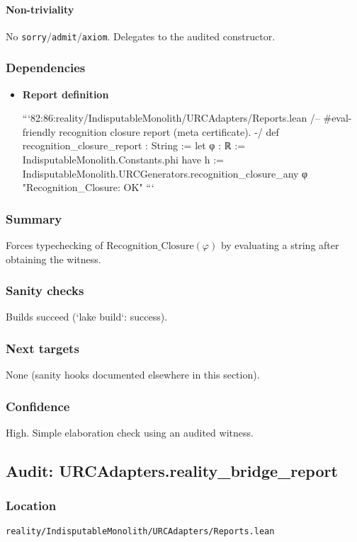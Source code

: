 \documentclass{article}
\newcommand{\FileRef}[1]{\texttt{#1}}
\begin{document}
\paragraph{Non-triviality}
No \texttt{sorry}/\texttt{admit}/\texttt{axiom}. Delegates to the audited constructor.

\subsubsection{Dependencies}
\begin{itemize}[leftmargin=*]
  \item \textbf{Report definition}

```82:86:reality/IndisputableMonolith/URCAdapters/Reports.lean
/-- #eval-friendly recognition closure report (meta certificate). -/
 def recognition_closure_report : String :=
  let φ : ℝ := IndisputableMonolith.Constants.phi
  have h := IndisputableMonolith.URCGenerators.recognition_closure_any φ
  "Recognition_Closure: OK"
```
\end{itemize}

\subsubsection{Summary}
Forces typechecking of \(\mathrm{Recognition\_Closure}(\varphi)\) by evaluating a string after obtaining the witness.

\subsubsection{Sanity checks}
Builds succeed (`lake build`: success).

\subsubsection{Next targets}
None (sanity hooks documented elsewhere in this section).

\subsubsection{Confidence}
High. Simple elaboration check using an audited witness.

\subsection{Audit: URCAdapters.reality\_bridge\_report}
\subsubsection{Location}
\FileRef{reality/IndisputableMonolith/URCAdapters/Reports.lean}
\end{document}

